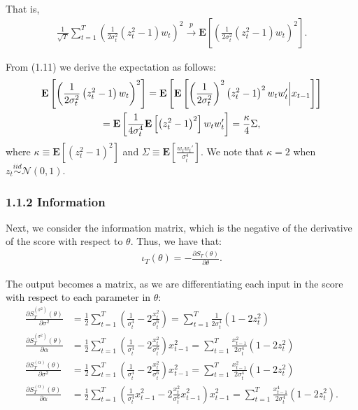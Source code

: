 \documentclass[11pt,a4paper,oneside]{article}
\newcommand{\lp}{\left(}
\newcommand{\rp}{\right)}
\newcommand{\rb}{\right]}
\newcommand{\lb}{\left[}
\newcommand{\ee}{\mathbf{E}}
\newcommand{\nnn}{\mathcal{N}}
\newcommand{\iid}{\overset{iid}{\sim}}
\newcommand{\sumt}{\sum_{t=1}^T}
\begin{document}
That is,
\begin{align}
    \frac{1}{\sqrt{T}}\sumt\lp \frac{1}{2\sigma_t^2}\lp z_t^2 - 1\rp w_t\rp^2 \overset{p}{\rightarrow} \ee\lb \lp \frac{1}{2\sigma_t^2}\lp z_t^2 - 1\rp w_t\rp^2\rb.
\end{align}

From (1.11) we derive the expectation as follows:
\begin{gather}
    \ee\lb \lp \frac{1}{2\sigma_t^2}\lp z_t^2 - 1\rp w_t\rp^2\rb 
        = \ee\lb \ee\lb \lp \frac{1}{2\sigma_t^2}\rp^2\lp z_t^2 - 1\rp^2 w_t w_t' \bigg \vert x_{t-1}\rb\rb \notag \\
        = \ee\lb \frac{1}{4\sigma_t^4}\ee\lb \lp z_t^2 - 1\rp^2\rb w_t w_t'\rb 
        = \frac{\kappa}{4}\Sigma,
\end{gather}
where $\kappa \equiv \ee\lb \lp z_t^2 - 1\rp^2\rb$ and $\Sigma \equiv \ee\lb \frac{w_t w_t'}{\sigma_t^4}\rb$. We note that $\kappa = 2$ when $z_t \iid \nnn \lp 0, 1\rp$.

\subsubsection{1.1.2 Information}
Next, we consider the information matrix, which is the negative of the derivative of the score with respect to $\theta$. Thus, we have that:
\begin{align}
    \iota_T\lp \theta\rp = -\frac{\partial S_T\lp \theta\rp}{\partial \theta}.
\end{align}

The output becomes a matrix, as we are differentiating each input in the score with respect to each parameter in $\theta$:
\begin{align}
    \frac{\partial S_T^{\lp \sigma^2\rp}\lp \theta\rp }{\partial \sigma^2} 
        &= \frac{1}{2} \sumt \lp \frac{1}{\sigma_t^4} - 2\frac{x_t^2}{\sigma_t^6}\rp 
        = \sumt \frac{1}{2 \sigma_t^4}\lp 1 - 2z_t^2 \rp \\
    \frac{\partial S_T^{\lp \sigma^2\rp}\lp \theta\rp }{\partial \alpha} 
        &= \frac{1}{2} \sumt \lp \frac{1}{\sigma_t^4} - 2\frac{x_t^2}{\sigma_t^6}\rp x_{t-1}^2 
        = \sumt \frac{x_{t-1}^2}{2\sigma_t^4}\lp 1 - 2z_t^2 \rp \\
    \frac{\partial S_T^{\lp \alpha\rp}\lp \theta\rp }{\partial \sigma^2} 
        &= \frac{1}{2} \sumt \lp \frac{1}{\sigma_t^4} - 2\frac{x_t^2}{\sigma_t^6}\rp x_{t-1}^2 
        = \sumt \frac{x_{t-1}^2}{2\sigma_t^4}\lp 1 - 2z_t^2 \rp \\
    \frac{\partial S_T^{\lp \alpha\rp}\lp \theta\rp }{\partial \alpha} 
        &= \frac{1}{2} \sumt \lp \frac{1}{\sigma_t^4}x_{t-1}^2 - 2\frac{x_t^2}{\sigma_t^6}x_{t-1}^2\rp x_{t-1}^2 
        = \sumt \frac{x_{t-1}^4}{2\sigma_t^4}\lp 1 - 2z_t^2 \rp.
\end{align}
\end{document}
